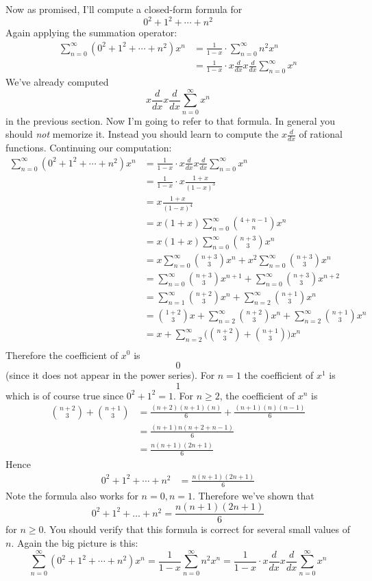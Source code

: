 Now as promised, I'll compute a closed-form formula for
\[
0^2 + 1^2 + \cdots + n^2
\]
Again applying the summation operator:
\begin{align*}
\sum_{n=0}^\infty (0^2 + 1^2 + \cdots + n^2) x^n
&= \frac{1}{1-x} \cdot \sum_{n=0}^\infty n^2x^n  \\
&= \frac{1}{1-x} \cdot x\frac{d}{dx} x\frac{d}{dx}\sum_{n=0}^\infty x^n 
\end{align*}
We've already computed
\[
x\frac{d}{dx} x\frac{d}{dx}\sum_{n=0}^\infty x^n
\]
in the previous section.
Now I'm going to refer to that formula.
In general you should
\textit{not} memorize it. 
Instead you should learn to compute the $x\frac{d}{dx}$ of 
rational functions.
Continuing our computation:
\begin{align*}
\sum_{n=0}^\infty (0^2 + 1^2 + \cdots + n^2) x^n 
&= \frac{1}{1-x} \cdot x\frac{d}{dx} x\frac{d}{dx}\sum_{n=0}^\infty x^n \\ 
&= \frac{1}{1 - x} \cdot  x \frac{1 + x}{(1-x)^3} \\
&= x\frac{1 + x}{(1-x)^4} \\
&= x(1 + x) \sum_{n=0}^\infty \binom{4 + n - 1}{n} x^n \\
&= x(1 + x) \sum_{n=0}^\infty \binom{n+3}{3} x^n \\
&= x\sum_{n=0}^\infty \binom{n+3}{3} x^n + x^2\sum_{n=0}^\infty \binom{n+3}{3} x^n \\
&= \sum_{n=0}^\infty \binom{n+3}{3} x^{n+1} 
+ \sum_{n=0}^\infty \binom{n+3}{3} x^{n+2} \\
&= \sum_{n=1}^\infty \binom{n+2}{3} x^{n} 
+ \sum_{n=2}^\infty \binom{n+1}{3} x^{n} \\
&= \binom{1+2}{3} x +
\sum_{n=2}^\infty \binom{n+2}{3} x^n
+
\sum_{n=2}^\infty
\binom{n+1}{3} 
x^{n} \\
&= x +
\sum_{n=2}^\infty 
\biggl(
\binom{n+2}{3}
+
\binom{n+1}{3} 
\biggr)
x^{n} \\
\end{align*}
Therefore the coefficient of $x^0$ is
\[
0
\]
(since it does not appear in the power series).
For $n = 1$ the coefficient of $x^1$ is
\[
1
\]
which is of course true since $0^2 + 1^2 = 1$.
For $n \geq 2$, the coefficient of $x^n$ is
\begin{align*}
\binom{n+2}{3} 
+
\binom{n+1}{3} 
&= \frac{(n+2)(n+1)(n)}{6} + \frac{(n+1)(n)(n-1)}{6} \\
&= \frac{(n+1)n(n+2 + n-1)}{6} \\
&= \frac{n(n+1)(2n+1)}{6}
\end{align*}
Hence
\begin{align*}
0^2 + 1^2 + \cdots + n^2
&= \frac{n(n+1)(2n+1)}{6}
\end{align*}
Note the formula also works for
$n=0, n=1$.
Therefore we've shown that
\[
0^2 + 1^2 + \ldots + n^2 
= 
\frac{n(n+1)(2n+1)}{6}
\]
for $n \geq 0$.
You should verify that this formula is correct for several small values
of $n$.
Again the big picture is this:
\[
\sum_{n=0}^\infty (0^2 + 1^2 + \cdots + n^2) x^n
= \frac{1}{1-x} \sum_{n=0}^\infty n^2 x^n
= \frac{1}{1-x} \cdot x\frac{d}{dx} x\frac{d}{dx} \sum_{n=0}^\infty x^n
\]



